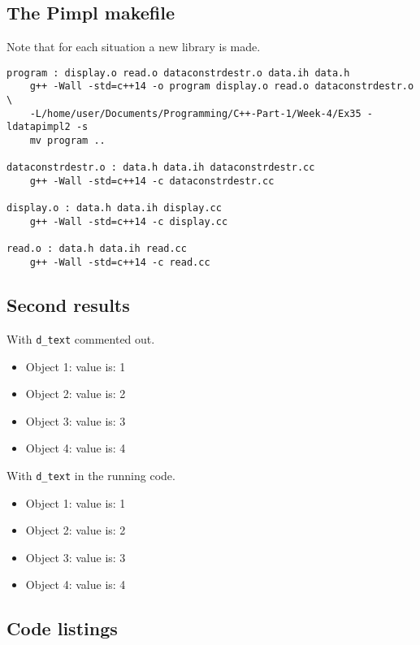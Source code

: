\documentclass[11pt]{article}
\begin{document}
\subsection*{The Pimpl makefile}
Note that for each situation a new library is made.
\begin{lstlisting}
program : display.o read.o dataconstrdestr.o data.ih data.h
	g++ -Wall -std=c++14 -o program display.o read.o dataconstrdestr.o \
	-L/home/user/Documents/Programming/C++-Part-1/Week-4/Ex35 -ldatapimpl2 -s
	mv program ..

dataconstrdestr.o : data.h data.ih dataconstrdestr.cc
	g++ -Wall -std=c++14 -c dataconstrdestr.cc

display.o : data.h data.ih display.cc
	g++ -Wall -std=c++14 -c display.cc

read.o : data.h data.ih read.cc
	g++ -Wall -std=c++14 -c read.cc
\end{lstlisting}

\subsection*{Second results}
With \texttt{d\_text} commented out.
\begin{itemize}
\item Object 1: value is: 1
\item Object 2: value is: 2
\item Object 3: value is: 3
\item Object 4: value is: 4
\end{itemize}

With \texttt{d\_text} in the running code.
\begin{itemize}
\item Object 1: value is: 1
\item Object 2: value is: 2
\item Object 3: value is: 3
\item Object 4: value is: 4
\end{itemize}

\subsection*{Code listings}





\end{document}
